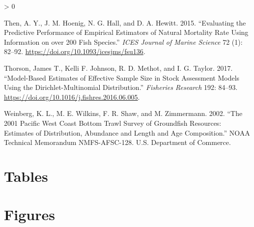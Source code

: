 \documentclass[11pt,
  english,
  a4paper,
]{article}
\newlength{\cslhangindent}
\newenvironment{CSLReferences}[2] %
 {%
  \setlength{\parindent}{0pt}
  \ifodd #1 \everypar{\setlength{\hangindent}{\cslhangindent}}\ignorespaces\fi
  \ifnum #2 > 0
  \setlength{\parskip}{#2\baselineskip}
  \fi
 }%
 {}
\begin{document}
\begin{CSLReferences}{1}{0}
\leavevmode\hypertarget{ref-then_evaluating_2015-1}{}%
Then, A. Y., J. M. Hoenig, N. G. Hall, and D. A. Hewitt. 2015. {``Evaluating the Predictive Performance of Empirical Estimators of Natural Mortality Rate Using Information on over 200 Fish Species.''} \emph{ICES Journal of Marine Science} 72 (1): 82--92. \url{https://doi.org/10.1093/icesjms/fsu136}.

\leavevmode\hypertarget{ref-thorson_model-based_2017}{}%
Thorson, James T., Kelli F. Johnson, R. D. Methot, and I. G. Taylor. 2017. {``Model-Based Estimates of Effective Sample Size in Stock Assessment Models Using the {Dirichlet}-Multinomial Distribution.''} \emph{Fisheries Research} 192: 84--93. \url{https://doi.org/10.1016/j.fishres.2016.06.005}.

\leavevmode\hypertarget{ref-weinberg_2001_2002}{}%
Weinberg, K. L., M. E. Wilkins, F. R. Shaw, and M. Zimmermann. 2002. {``The 2001 {Pacific} {West} {Coast} Bottom Trawl Survey of Groundfish Resources: Estimates of Distribution, Abundance and Length and Age Composition.''} NOAA Technical Memorandum NMFS-AFSC-128. U.S. Department of Commerce.

\end{CSLReferences}

\leavevmode\tagmcend\tagstructend

\clearpage


\hypertarget{tables}{%
\section{Tables}\label{tables}}

\leavevmode\tagmcend\tagstructend



\newpage



\newpage

\clearpage


\hypertarget{figures}{%
\section{Figures}\label{figures}}

\leavevmode\tagmcend\tagstructend

\end{document}

